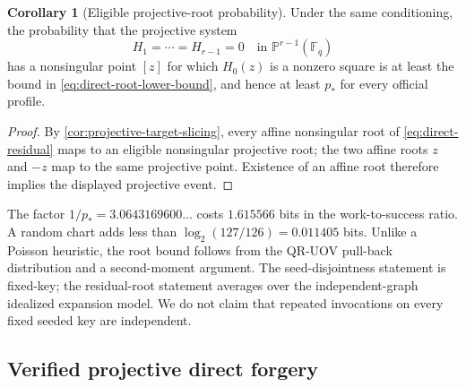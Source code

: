 \documentclass[11pt,a4paper]{article}
\theoremstyle{definition}
\newtheorem{corollary}[theorem]{Corollary}
\theoremstyle{remark}
\newcommand{\F}{\mathbb F}
\newcommand{\PP}{\mathbb P}
\begin{document}
\begin{corollary}[Eligible projective-root probability]\label{cor:projective-root-probability}
Under the same conditioning, the probability that the projective system
\[
 H_1=\cdots=H_{r-1}=0\quad\text{in }\PP^{r-1}(\F_q)
\]
has a nonsingular point $[z]$ for which $H_0(z)$ is a nonzero square is at
least the bound in \eqref{eq:direct-root-lower-bound}, and hence at least
$p_*$ for every official profile.
\end{corollary}

\begin{proof}
By \cref{cor:projective-target-slicing}, every affine nonsingular root of
\eqref{eq:direct-residual} maps to an eligible nonsingular projective root;
the two affine roots $z$ and $-z$ map to the same projective point.  Existence
of an affine root therefore implies the displayed projective event.
\end{proof}

The factor $1/p_*=3.0643169600\ldots$ costs $1.615566$ bits in the
work-to-success ratio.  A random chart adds less than
$\log_2(127/126)=0.011405$ bits.  Unlike a Poisson heuristic, the root bound
follows from the QR-UOV pull-back distribution and a second-moment argument.
The seed-disjointness statement is fixed-key; the residual-root statement
averages over the independent-graph idealized expansion model.  We do not
claim that repeated invocations on every fixed seeded key are independent.

\subsection{Verified projective direct forgery}
\end{document}
